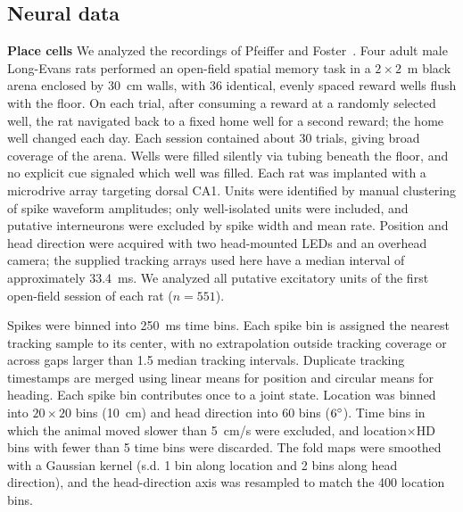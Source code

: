 \documentclass[11pt]{article}
\begin{document}
\subsection{Neural data}

{\bf Place cells}
We analyzed the recordings of Pfeiffer and Foster~\cite{Pfeiffer2013}. Four adult male Long-Evans rats performed an open-field spatial memory task in a $2 \times 2$~m black arena enclosed by 30~cm walls, with 36 identical, evenly spaced reward wells flush with the floor. On each trial, after consuming a reward at a randomly selected well, the rat navigated back to a fixed home well for a second reward; the home well changed each day. Each session contained about 30 trials, giving broad coverage of the arena. Wells were filled silently via tubing beneath the floor, and no explicit cue signaled which well was filled.
Each rat was implanted with a microdrive array targeting dorsal CA1. Units were identified by manual clustering of spike waveform amplitudes; only well-isolated units were included, and putative interneurons were excluded by spike width and mean rate. Position and head direction were acquired with two head-mounted LEDs and an overhead camera; the supplied tracking arrays used here have a median interval of approximately 33.4~ms. We analyzed all putative excitatory units of the first open-field session of each rat ($n=551$).

Spikes were binned into 250~ms time bins. Each spike bin is assigned the nearest tracking sample to its center, with no extrapolation outside tracking coverage or across gaps larger than 1.5 median tracking intervals. Duplicate tracking timestamps are merged using linear means for position and circular means for heading. Each spike bin contributes once to a joint state. Location was binned into $20\times 20$ bins (10~cm) and head direction into 60 bins ($6\degree$). Time bins in which the animal moved slower than 5~cm/s were excluded, and location$\times$HD bins with fewer than 5 time bins were discarded. The fold maps were smoothed with a Gaussian kernel (s.d. 1 bin along location and 2 bins along head direction), and the head-direction axis was resampled to match the 400 location bins.
\end{document}
